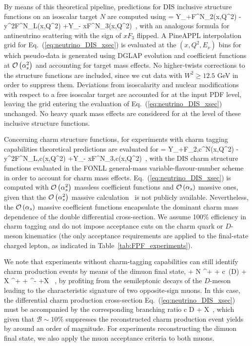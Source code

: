 By means of this theoretical pipeline, predictions for
DIS inclusive structure functions on an isoscalar target $N$ are computed
using
\be
\label{eq:neutrino_DIS_xsec}
 =  \lc Y_+F^{\nu N}_2(x,Q^2) - y^2F^{\nu N}_L(x,Q^2) +Y_- xF^{\nu N}_3(x,Q^2)\rc  \, ,
\ee
with an analogous formula for antineutrino scattering with the sign of $xF_3$ flipped.
%
A {\sc\small PineAPPL} interpolation grid for
Eq.~(\ref{eq:neutrino_DIS_xsec}) is evaluated at the $(x,Q^2,E_\nu)$ bins
for which pseudo-data is generated using DGLAP evolution and coefficient
functions at $\mathcal{O}\left( \alpha_s^2\right)$ and accounting for target mass effects.
%
No higher-twists corrections to the structure functions are included, since we cut
data with $W^2 \ge 12.5$ GeV in order to suppress them.
%
Deviations from isoscalarity and nuclear modifications with respect
to a free isoscalar target are accounted for at the input PDF level,
leaving the grid entering the evaluation of Eq.~(\ref{eq:neutrino_DIS_xsec}) unchanged.
%
No heavy quark mass effects are considered for at the level of these inclusive structure functions.

Concerning charm structure functions, for experiments with charm tagging
capabilities theoretical predictions are evaluated for
\be
\label{eq:neutrino_DIS_xsec}
 =  \lc Y_+F_{2,c}^{\nu N}(x,Q^2) - y^2F^{\nu N}_{L,c}(x,Q^2) +Y_- xF^{\nu N}_{3,c}(x,Q^2)\rc  \, ,
\ee
with the DIS charm structure functions evaluated in the FONLL general-mass variable-flavour-number
scheme~\cite{Forte:2010ta,Ball:2011mu,Faura:2020oom} in order to account for charm mass effects.
%
Eq.~(\ref{eq:neutrino_DIS_xsec}) is computed with $\mathcal{O}\left( \alpha_s^2\right)$ massless
coefficient functions and $\mathcal{O}\left( \alpha_s\right)$ massive ones, given
that the $\mathcal{O}\left( \alpha_s^2\right)$ massive calculation~\cite{Gao:2017kkx} is not publicly available.
%
Nevertheless, the $\mathcal{O}\left( \alpha_s\right)$ massive coefficient functions
encapsulate the dominant charm mass dependence of the double differential
cross-section.
%
We assume 100\% efficiency in charm tagging and do not impose acceptance cuts on the charm
quark or $D$-meson kinematics (the only acceptance requirements are applied to the final-state
charged lepton, as indicated in  Table~\ref{tab:FPF_experiments}).

We note that experiments without charm-tagging capabilities can still identify charm production
events by means of the dimuon final state,
\be
\nu + N \to \mu^+ + c~(\to D) + X \to \mu^+ + \mu^- +X \, ,
\ee
by profiting from the semileptonic decays of the $D$-meson leading
to the characteristic signature of two opposite-sign muons.
%
In this case, the  differential charm production cross-section Eq.~(\ref{eq:neutrino_DIS_xsec})
must be accompanied by the corresponding branching ratio
\be
{}\lp c \to D \to \mu + X\rp \, ,
\ee
which given that $\mathcal{B}\sim 10\%$ suppresses the reconstructed charm
production event yields by around an order of magnitude.
%
For experiments reconstructing the dimuon final state,
we also apply the muon acceptance criteria to both muons.


